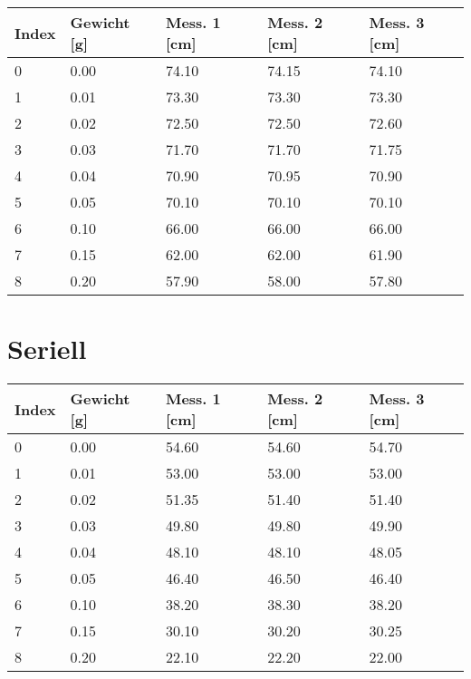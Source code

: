 \documentclass[../main.tex]{subfiles} %
\begin{document}
\begin{center}
    \begin{tabular}{ |l|l|l|l|l| } \hline\rowcolor{Gray!50}
        Index & Gewicht [g] & Mess. 1 [cm] & Mess. 2 [cm] & Mess. 3 [cm] \\\toprule\hline
        0     & 0.00        & 74.10        & 74.15        & 74.10        \\\hline
        1     & 0.01        & 73.30        & 73.30        & 73.30        \\\hline
        2     & 0.02        & 72.50        & 72.50        & 72.60        \\\hline
        3     & 0.03        & 71.70        & 71.70        & 71.75        \\\hline
        4     & 0.04        & 70.90        & 70.95        & 70.90        \\\hline
        5     & 0.05        & 70.10        & 70.10        & 70.10        \\\hline
        6     & 0.10        & 66.00        & 66.00        & 66.00        \\\hline
        7     & 0.15        & 62.00        & 62.00        & 61.90        \\\hline
        8     & 0.20        & 57.90        & 58.00        & 57.80        \\\hline
    \end{tabular}
\end{center}

\section{Seriell}\label{sec:seriell}

\begin{center}
    \begin{tabular}{ |l|l|l|l|l| } \hline\rowcolor{Gray!50}
        Index & Gewicht [g] & Mess. 1 [cm] & Mess. 2 [cm] & Mess. 3 [cm] \\\toprule\hline
        0     & 0.00        & 54.60        & 54.60        & 54.70        \\\hline
        1     & 0.01        & 53.00        & 53.00        & 53.00        \\\hline
        2     & 0.02        & 51.35        & 51.40        & 51.40        \\\hline
        3     & 0.03        & 49.80        & 49.80        & 49.90        \\\hline
        4     & 0.04        & 48.10        & 48.10        & 48.05        \\\hline
        5     & 0.05        & 46.40        & 46.50        & 46.40        \\\hline
        6     & 0.10        & 38.20        & 38.30        & 38.20        \\\hline
        7     & 0.15        & 30.10        & 30.20        & 30.25        \\\hline
        8     & 0.20        & 22.10        & 22.20        & 22.00        \\\hline
    \end{tabular}
\end{center}
\end{document}
